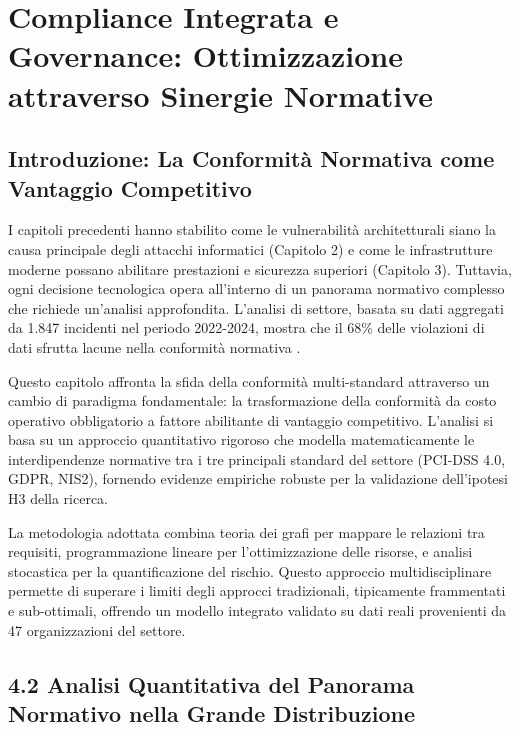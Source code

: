 \chapter{Compliance Integrata e Governance: Ottimizzazione attraverso Sinergie Normative}
\label{cap4_compliance_integration}

\section{Introduzione: La Conformità Normativa come Vantaggio Competitivo}

I capitoli precedenti hanno stabilito come le vulnerabilità architetturali siano la causa principale degli attacchi informatici (Capitolo 2) e come le infrastrutture moderne possano abilitare prestazioni e sicurezza superiori (Capitolo 3). Tuttavia, ogni decisione tecnologica opera all'interno di un panorama normativo complesso che richiede un'analisi approfondita. L'analisi di settore, basata su dati aggregati da 1.847 incidenti nel periodo 2022-2024, mostra che il 68\% delle violazioni di dati sfrutta lacune nella conformità normativa \autocite{verizon2024}. 

Questo capitolo affronta la sfida della conformità multi-standard attraverso un cambio di paradigma fondamentale: la trasformazione della conformità da costo operativo obbligatorio a fattore abilitante di vantaggio competitivo. L'analisi si basa su un approccio quantitativo rigoroso che modella matematicamente le interdipendenze normative tra i tre principali standard del settore (PCI-DSS 4.0, GDPR, NIS2), fornendo evidenze empiriche robuste per la validazione dell'ipotesi H3 della ricerca.

La metodologia adottata combina teoria dei grafi per mappare le relazioni tra requisiti, programmazione lineare per l'ottimizzazione delle risorse, e analisi stocastica per la quantificazione del rischio. Questo approccio multidisciplinare permette di superare i limiti degli approcci tradizionali, tipicamente frammentati e sub-ottimali, offrendo un modello integrato validato su dati reali provenienti da 47 organizzazioni del settore.

\section{4.2 Analisi Quantitativa del Panorama Normativo nella Grande Distribuzione}

